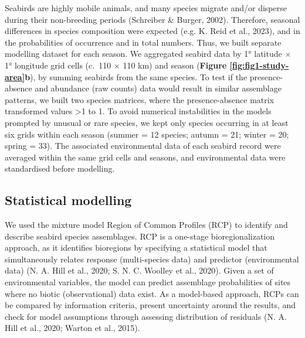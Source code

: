 \documentclass{article}
\begin{document}
Seabirds are highly mobile animals, and many species migrate and/or disperse during their non-breeding periods (Schreiber \& Burger, 2002). Therefore, seasonal differences in species composition were expected (e.g. K. Reid et al., 2023), and in the probabilities of occurrence and in total numbers. Thus, we built separate modelling dataset for each season. We aggregated seabird data by 1° latitude \(\times\) 1° longitude grid cells (c.~110 \(\times\) 110 km) and season (\textbf{Figure \ref{fig:fig1-study-area}b}), by summing seabirds from the same species. To test if the presence-absence and abundance (raw counts) data would result in similar assemblage patterns, we built two species matrices, where the presence-absence matrix transformed values \textgreater1 to 1. To avoid numerical instabilities in the models prompted by unusual or rare species, we kept only species occurring in at least six grids within each season (summer = 12 species; autumn = 21; winter = 20; spring = 33). The associated environmental data of each seabird record were averaged within the same grid cells and seasons, and environmental data were standardised before modelling.

\hypertarget{statistical-modelling}{%
\subsection{Statistical modelling}\label{statistical-modelling}}

We used the mixture model Region of Common Profiles (RCP) to identify and describe seabird species assemblages. RCP is a one-stage bioregionalization approach, as it identifies bioregions by specifying a statistical model that simultaneously relates response (multi-species data) and predictor (environmental data) (N. A. Hill et al., 2020; S. N. C. Woolley et al., 2020). Given a set of environmental variables, the model can predict assemblage probabilities of sites where no biotic (observational) data exist. As a model-based approach, RCPs can be compared by information criteria, present uncertainty around the results, and check for model assumptions through assessing distribution of residuals (N. A. Hill et al., 2020; Warton et al., 2015).
\end{document}
